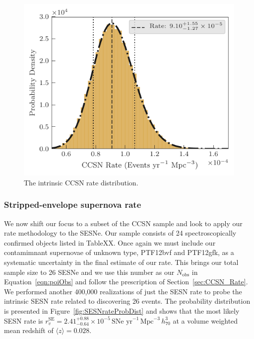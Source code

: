 \documentclass[a4paper,fleqn,usenatbib]{mnras}
\begin{document}
\begin{figure}
	\includegraphics[width=\linewidth]{./allCC_Rate.pdf}
    \caption{The intrinsic CCSN rate distribution.}
    \label{fig:ccRateDist}
\end{figure}


\subsubsection{Stripped-envelope supernova rate}
\label{SESN_Rate}

We now shift our focus to a subset of the CCSN sample and look to apply our rate methodology to the SESNe. Our sample consists of 24 spectroscopically confirmed objects listed in TableXX. Once again we must include our contamimnant supernovae of unknown type, PTF12bvf and PTF12gfk, as a systematic uncertainty in the final estimate of our rate. This brings our total sample size to 26 SESNe and we use this number as our $N_\mathrm{obs}$ in Equation~\ref{eqn:poiObs} and follow the prescription of Section~\ref{sec:CCSN_Rate}. We performed another 400,000 realizations of just the SESN rate to probe the intrinsic SESN rate related to discovering 26 events. The probability distribution is presented in Figure~\ref{fig:SESNrateProbDist} and shows that the most likely SESN rate is $r^\mathrm{SE}_v=2.41_{-0.64}^{+0.88}\times10^{-5}\,\text{SNe yr}^{-1}\,\text{Mpc}^{-3}\, h_{70}^{3}$ at a volume weighted mean redshift of $ \langle z \rangle = 0.028$.
\end{document}
